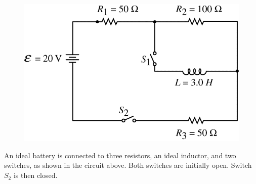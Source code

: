 %
\begin{figure}[H]
\centering
\includegraphics[scale=0.3]{images/img-024-050.png}
\end{figure}

\question
An ideal battery is connected to three resistors, an ideal inductor, and two switches, as shown in the circuit above. Both switches are initially open. Switch $S_{2}$ is then closed.  %

